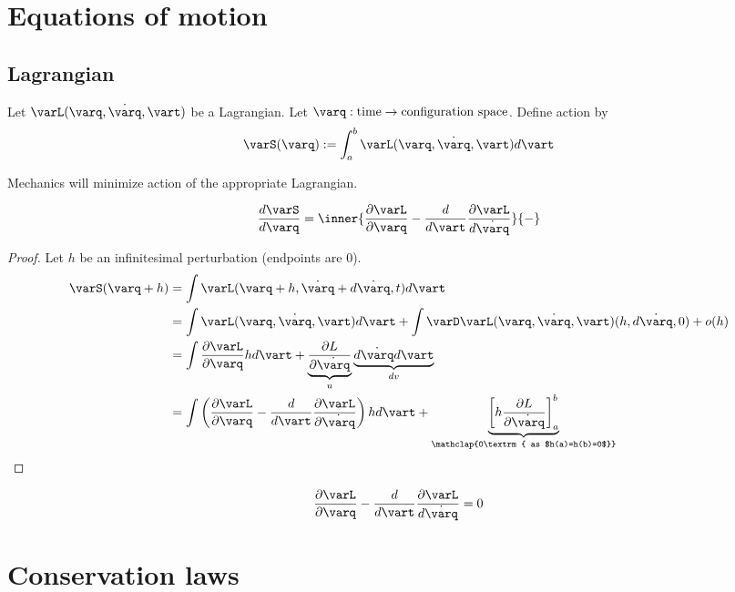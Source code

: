 \documentclass{scrbook}
\numberwithin{thms}{chapter}
\newcommand{\der}{\dot}
\begin{document}
\chapter{Equations of motion}
\section{Lagrangian}
  \newcommand{\q}{\varq}
  \newcommand{\derq}{\der \q}
  \newcommand{\dt}{d\vart}
\begin{defn}[action]
  Let $\varL(\q,\derq, \vart)$ be a Lagrangian.
  Let $\q:\textrm{time}\to\textrm{configuration space}$. 
  Define action by 
  \[
    \varS(\q):=\int_a^b \varL(\q,\derq, \vart) \dt 
  \]
\end{defn}

Mechanics will minimize action of the appropriate Lagrangian.
\begin{theorem}
  \label{th:euler-lagrange}
  \[
    \frac{d\varS}{d\q} = \inner{\frac{\partial \varL}{\partial \q} - \frac{d}{d\vart}\frac{\partial \varL}{d\derq}}{-}
  \]
\end{theorem}
\begin{proof}
  \newcommand{\dq}{h}
  \newcommand{\derdq}{h'}
  Let $\dq$ be an infinitesimal perturbation (endpoints are $0$). 
  \begin{align*}
    \varS(\q+\dq) &= \int \varL(\q+\dq,\derq + d\derq,t)\dt \\
           &= \int \varL(\q,\derq,\vart)\dt + \int \varD\varL(\varq,\derq, \vart)(\dq,d\derq,0) + o(\dq) \\
           &= \int \frac{\partial \varL}{\partial \q} \dq\dt + \underbrace{\frac{\partial L}{\partial \derq}}_{u} \underbrace{d\derq \dt}_{dv} \\
           &=\int\left(\frac{\partial \varL}{\partial \q} - \frac{d}{d\vart} \frac{\partial \varL}{\partial \derq}\right)\dq \dt + \underbrace{\left[\dq\frac{\partial L}{\partial \derq} \right]_a^b}_{\mathclap{0\textrm{ as $\dq(a)=\dq(b)=0$}}}
  \end{align*}
\end{proof}
\begin{cor}
  \[
    \frac{\partial \varL}{\partial \varq} - \frac{d}{d\vart}\frac{\partial \varL}{d\der \varq} = 0
  \]
\end{cor}

\chapter{Conservation laws}
\end{document}

